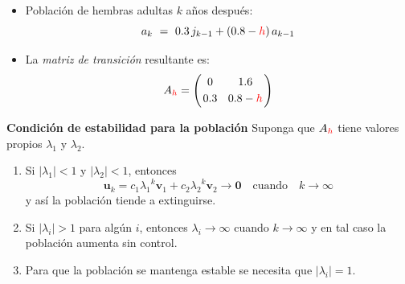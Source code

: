 {\nologo 
\begin{frame}%
			
	\begin{itemize}
		\item Población de hembras adultas $k$ años después:
		\[
		a_k \ = \ 0.3\,j_{k-1} + (0.8-{\color{red}h})\,a_{k-1}
		\] 
		
		\vspace{2mm}
		\item La \textit{matriz de transición} resultante es:
		\[	
		A_{\color{red}h} =
		\left(
		\begin{array}{@{\hspace{0.2\tabcolsep}}c@{\hspace{1.6\tabcolsep}}c@{\hspace{0.2\tabcolsep}}}
		0 & 1.6 \\[1mm]
		0.3 & 0.8-{\color{red}h}
		\end{array}
		\right)		
		\]				
	\end{itemize}
	
	\vspace{-2mm}
	\begin{prop}{\textbf{Condición de estabilidad para la población}}%
		\justifying
		Suponga que $A_{\color{red}h}$ tiene valores propios $\lambda_1$ y $\lambda_2$.
		
		\begin{enumerate}[$a$]
			\item Si $|\lambda_1|<1$ y $|\lambda_2|<1$, entonces
			\[
			\mathbf{u}_k = 
			c_1{\lambda_1}^k\mathbf{v}_1 + c_2{\lambda_2}^k\mathbf{v}_2  \to \mathbf{0}
			\quad \text{cuando} \quad k\to \infty 			
			\]
			y así la población tiende a extinguirse.
			
			\vspace{2mm}
			\item Si $|\lambda_i|>1$ para algún $i$, entonces $\lambda_i\to \infty$ cuando $k\to \infty$ y 
			en tal caso la población aumenta sin control.
			
			\vspace{2mm}
			\item Para que la población se mantenga estable se necesita que $|\lambda_i|=1$.
		\end{enumerate}		
		
		\vspace{-1mm}
	\end{prop}	
	
\end{frame}
}

